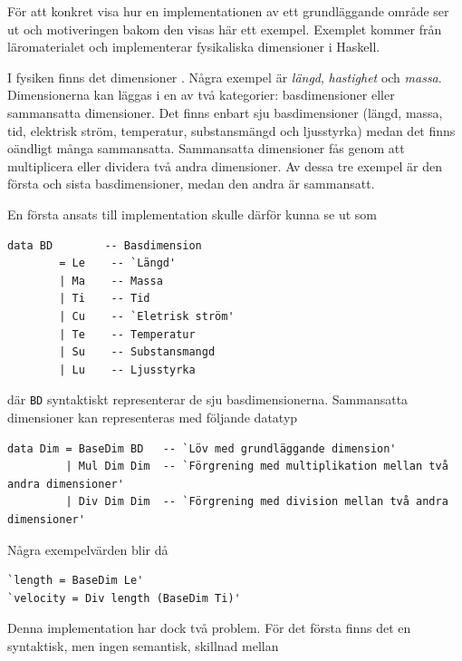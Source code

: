 \begin{draft}
För att konkret visa hur en implementationen av ett grundläggande område ser ut
och motiveringen bakom den visas här ett exempel. Exemplet kommer från
läromaterialet och implementerar fysikaliska dimensioner i Haskell.

I fysiken finns det dimensioner \cite{dimensioner_ne}. Några exempel är \textit{längd},
\textit{hastighet} och \textit{massa}. Dimensionerna kan läggas i en av två
kategorier: basdimensioner eller sammansatta dimensioner. Det finns enbart sju 
basdimensioner (längd, massa, tid, elektrisk ström, temperatur, substansmängd och
ljusstyrka) medan det finns oändligt många sammansatta. Sammansatta
dimensioner fås genom att multiplicera eller dividera två andra dimensioner. Av
dessa tre exempel är den första och sista basdimensioner, medan den andra är
sammansatt.

En första ansats till implementation skulle därför kunna se ut som

\begin{lstlisting}[frame=none, belowskip=-0.5\baselineskip, xleftmargin=0.5in]
 data BD        -- Basdimension
        = Le    -- `Längd'
        | Ma    -- Massa
        | Ti    -- Tid
        | Cu    -- `Eletrisk ström'
        | Te    -- Temperatur
        | Su    -- Substansmangd
        | Lu    -- Ljusstyrka
\end{lstlisting}

där \texttt{BD} syntaktiskt representerar de sju basdimensionerna.
Sammansatta dimensioner kan representeras med följande datatyp

\begin{lstlisting}[frame=none, belowskip=-0.5\baselineskip, xleftmargin=0.5in]
data Dim = BaseDim BD   -- `Löv med grundläggande dimension'
         | Mul Dim Dim  -- `Förgrening med multiplikation mellan två andra dimensioner'
         | Div Dim Dim  -- `Förgrening med division mellan två andra dimensioner'
\end{lstlisting}

Några exempelvärden blir då

\begin{lstlisting}[frame=none, belowskip=-0.5\baselineskip, xleftmargin=0.5in]
`length = BaseDim Le'
`velocity = Div length (BaseDim Ti)'
\end{lstlisting}

Denna implementation har dock två problem. För det första finns det en
syntaktisk, men ingen semantisk, skillnad mellan


\end{draft}
